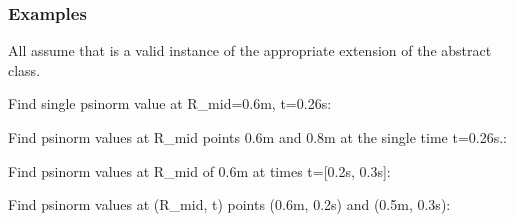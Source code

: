 \documentclass[letterpaper,10pt,english]{sphinxmanual}
\begin{document}
\begin{fulllineitems}
\begin{fulllineitems}
\begin{quote}
\begin{description}
\begin{itemize}
\end{itemize}


\end{description}\end{quote}
\subsubsection*{Examples}

All assume that  is a valid instance of the appropriate
extension of the {\hyperref[\detokenize{eqtools:eqtools.core.Equilibrium}]{}} abstract class.

Find single psinorm value at R\_mid=0.6m, t=0.26s:

\begin{sphinxVerbatim}[commandchars=\\\{\}]
    
\end{sphinxVerbatim}

Find psinorm values at R\_mid points 0.6m and 0.8m at the
single time t=0.26s.:

\begin{sphinxVerbatim}[commandchars=\\\{\}]
   \PYG{p}{[} \PYG{p}{]} 
\end{sphinxVerbatim}

Find psinorm values at R\_mid of 0.6m at times t={[}0.2s, 0.3s{]}:

\begin{sphinxVerbatim}[commandchars=\\\{\}]
    \PYG{p}{[} \PYG{p}{]}
\end{sphinxVerbatim}

Find psinorm values at (R\_mid, t) points (0.6m, 0.2s) and (0.5m, 0.3s):


\end{fulllineitems}
\end{fulllineitems}
\end{document}
